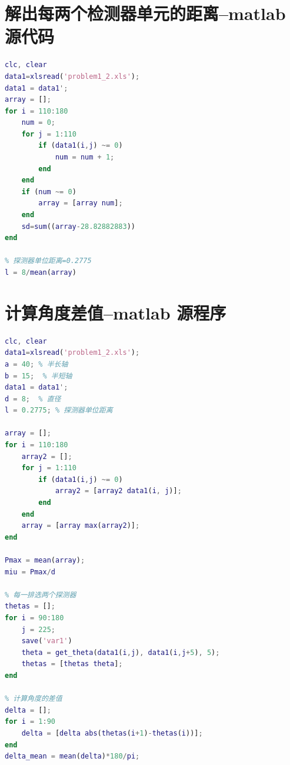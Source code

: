 \documentclass[withoutpreface,bwprint]{cumcmthesis} %
\begin{document}
\newpage
\appendix
 \section{解出每两个检测器单元的距离--matlab源代码}
\begin{lstlisting}[language=matlab]
clc, clear
data1=xlsread('problem1_2.xls');
data1 = data1';
array = [];
for i = 110:180
    num = 0;
    for j = 1:110
        if (data1(i,j) ~= 0)
            num = num + 1;
        end
    end
    if (num ~= 0)
        array = [array num];
    end
    sd=sum((array-28.82882883))
end

% 探测器单位距离=0.2775
l = 8/mean(array)
 \end{lstlisting}
\section{计算角度差值--matlab 源程序}
\begin{lstlisting}[language=matlab]
clc, clear
data1=xlsread('problem1_2.xls');
a = 40; % 半长轴
b = 15;  % 半短轴
data1 = data1';
d = 8;  % 直径
l = 0.2775; % 探测器单位距离

array = [];
for i = 110:180
    array2 = [];
    for j = 1:110
        if (data1(i,j) ~= 0)
            array2 = [array2 data1(i, j)];
        end
    end
    array = [array max(array2)];
end

Pmax = mean(array);
miu = Pmax/d

% 每一排选两个探测器
thetas = [];
for i = 90:180
    j = 225;
    save('var1')
    theta = get_theta(data1(i,j), data1(i,j+5), 5);
    thetas = [thetas theta];
end

% 计算角度的差值
delta = [];
for i = 1:90
    delta = [delta abs(thetas(i+1)-thetas(i))];
end
delta_mean = mean(delta)*180/pi;
 \end{lstlisting}
\end{document}
